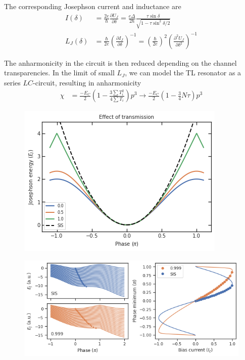 The corresponding Josephson current and inductance are 
\begin{align}
I(\delta) &= \frac{2e}{\hbar}\frac{\partial U_J}{\partial\delta} = \frac{e\Delta}{2\hbar}\frac{\tau\sin\delta}{\sqrt{1-\tau\sin^2\delta/2}} \\
L_J(\delta) &= \frac{\hbar}{2e}\left( \frac{\partial I_J}{\partial\delta} \right)^{-1} = \left(\frac{\hbar}{2e}\right)^2\left(\frac{\partial^2U_J}{\partial\delta^2}\right)^{-1}
\end{align}

The anharmonicity in the circuit is then reduced depending on the channel transparencies.
In the limit of small $L_J$, we can model the TL resonator as a series $LC$-circuit, resulting in anharmonicity
\begin{align}
\chi &= \frac{-E_C}{2} \left( 1-\frac{3\sum T_i^2}{4\sum T_i} \right) p^3 \rightarrow \frac{-E_C}{2} \left(1-\frac{3}{4}N\tau \right) p^3 
\end{align}

\begin{figure}
	\centering
	\includegraphics[width=0.7\linewidth]{chapter-introduction/figs/EJ_phase_tau}
	\caption{}
	\label{fig:ejphasetau}
\end{figure}

\begin{figure}
	\centering
	\includegraphics[width=0.7\linewidth]{chapter-introduction/figs/EJ_phase_Ib}
	\caption{}
	\label{fig:ejphaseib}
\end{figure}


